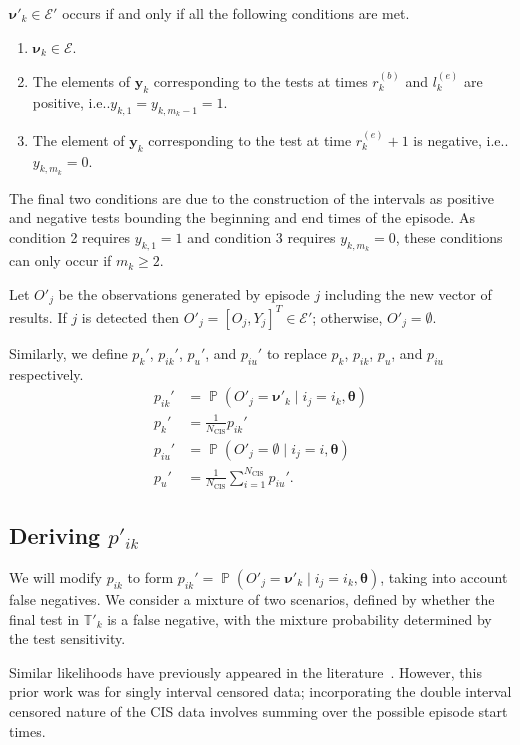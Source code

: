 \documentclass[12pt]{article}
\makeatletter
\DeclareMathOperator{\prob}{\mathbb{P}}
\newcommand\set{\mathcal}
\renewcommand{\vec}[1]{\bm{#1}}
\newcommand{\Ncis}{N_\text{CIS}}
\newcommand{\sched}{\mathbb{T}}
\DeclareRobustCommand\onedot{\futurelet\@let@token\@onedot}
\def\@onedot{\ifx\@let@token.\else.\null\fi\xspace}
\def\ie{i.e\onedot} \def\Ie{{I.e}\onedot}
\makeatother
\begin{document}
$\vec{\nu}'_k \in \set{E}'$ occurs if and only if all the following conditions are met.
\begin{enumerate}
  \item $\vec{\nu}_k \in \set{E}$.
  \item The elements of $\vec{y}_k$ corresponding to the tests at times $r_k^{(b)}$ and $l_k^{(e)}$ are positive, \ie $y_{k,1} = y_{k,m_k-1} = 1$.
  \item The element of $\vec{y}_k$ corresponding to the test at time $r_k^{(e)} + 1$ is negative, \ie $y_{k,m_k} = 0$.
\end{enumerate}
The final two conditions are due to the construction of the intervals as positive and negative tests bounding the beginning and end times of the episode.
As condition 2 requires $y_{k,1} = 1$ and condition 3 requires $y_{k,m_k} = 0$, these conditions can only occur if $m_k \geq 2$.

Let $O'_j$ be the observations generated by episode $j$ including the new vector of results.
If $j$ is detected then $O'_j = [O_j, Y_j]^T \in \set{E}'$; otherwise, $O'_j = \emptyset$.

Similarly, we define $p_k'$, $p_{ik}'$, $p_u'$, and $p_{iu}'$ to replace $p_k$, $p_{ik}$, $p_u$, and $p_{iu}$ respectively.
\begin{align}
    p_{ik}' &= \prob(O'_j = \vec{\nu}'_k \mid i_j = i_k, \vec{\theta}) \\
    p_k' &= \frac{1}{\Ncis} p_{ik}' \\
    p_{iu}' &= \prob(O'_j = \emptyset \mid i_j = i, \vec{\theta}) \\
    p_u' &= \frac{1}{\Ncis} \sum_{i=1}^{\Ncis} p_{iu}'.
\end{align}

\subsection{Deriving $p'_{ik}$} \label{imperf-test:sec:modifying-p_ia}

We will modify $p_{ik}$ to form $p_{ik}' = \prob(O'_j = \vec{\nu}'_k \mid i_j = i_k, \vec{\theta})$, taking into account false negatives.
We consider a mixture of two scenarios, defined by whether the final test in $\sched'_{k}$ is a false negative, with the mixture probability determined by the test sensitivity.

Similar likelihoods have previously appeared in the literature~\citep[e.g.][eq.\ (2)]{piresIntervalMisclassify}.
However, this prior work was for singly interval censored data; incorporating the double interval censored nature of the CIS data involves summing over the possible episode start times.
\end{document}
